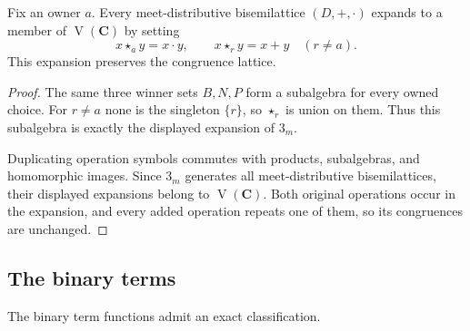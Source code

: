 \begin{proposition}
\label{core:prop:dissemilattice-lift}
Fix an owner $a$. Every meet-distributive bisemilattice $(D,+,\cdot)$
expands to a member of $\operatorname V(\mathbf C)$ by setting
\[
 x\star_a y=x\cdot y,\qquad
 x\star_r y=x+y\quad(r\ne a).
\]
This expansion preserves the congruence lattice.
\end{proposition}
\begin{proof}
The same three winner sets $B,N,P$ form a subalgebra for every
owned choice. For $r\ne a$ none is the singleton $\{r\}$, so
$\star_r$ is union on them. Thus this subalgebra is exactly the
displayed expansion of $3_m$.

Duplicating operation symbols commutes with products, subalgebras,
and homomorphic images. Since $3_m$ generates all meet-distributive
bisemilattices, their displayed expansions belong to
$\operatorname V(\mathbf C)$. Both original operations occur in
the expansion, and every added operation repeats one of them,
so its congruences are unchanged.

\end{proof}

\subsection{The binary terms}
\label{app:core-binary}

The binary term functions admit an exact classification.

